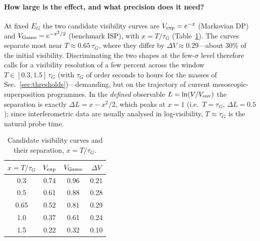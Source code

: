 \documentclass[aps,prd,onecolumn,amsmath,amssymb,nofootinbib,superscriptaddress]{revtex4-2}
\begin{document}
\paragraph{How large is the effect, and what precision does it need?} At fixed $E_G$ the two
candidate visibility curves are $V_{\rm exp}=e^{-x}$ (Markovian DP) and $V_{\rm Gauss}=e^{-x^2/2}$
(benchmark ISP), with $x=T/\tau_G$ (Table~\ref{tab:visibility}). The curves separate most near
$T\approx0.65\,\tau_G$, where they differ by $\Delta V\approx0.29$---about 30\% of the initial
visibility. Discriminating the two shapes at the few-$\sigma$ level therefore calls for a visibility
resolution of a few percent across the window $T\in[0.3,1.5]\,\tau_G$ (with $\tau_G$ of order seconds
to hours for the masses of Sec.~\ref{sec:thresholds})---demanding, but on the trajectory of current
mesoscopic-superposition programmes. In the \emph{defined} observable $L=\ln(V/V_{\rm env})$ the
separation is exactly $\Delta L=x-x^2/2$, which peaks at $x=1$ (i.e.\ $T=\tau_G$, $\Delta L=0.5$);
since interferometric data are usually analysed in log-visibility, $T\approx\tau_G$ is the natural
probe time.

\begin{table}[h]
\centering
\caption{Candidate visibility curves and their separation, $x=T/\tau_G$.}\label{tab:visibility}
\begin{tabular}{cccc}
\hline\hline
$x=T/\tau_G$ & $V_{\rm exp}$ & $V_{\rm Gauss}$ & $\Delta V$ \\
\hline
0.3 & 0.74 & 0.96 & 0.21 \\
0.5 & 0.61 & 0.88 & 0.28 \\
0.65 & 0.52 & 0.81 & 0.29 \\
1.0 & 0.37 & 0.61 & 0.24 \\
1.5 & 0.22 & 0.32 & 0.10 \\
\hline\hline
\end{tabular}
\end{table}
\end{document}
